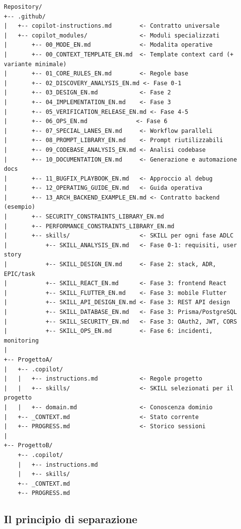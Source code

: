 \begin{lstlisting}[language={},title={Struttura del framework}]
Repository/
+-- .github/
|   +-- copilot-instructions.md        <- Contratto universale
|   +-- copilot_modules/               <- Moduli specializzati
|       +-- 00_MODE_EN.md              <- Modalita operative
|       +-- 00_CONTEXT_TEMPLATE_EN.md  <- Template context card (+ variante minimale)
|       +-- 01_CORE_RULES_EN.md        <- Regole base
|       +-- 02_DISCOVERY_ANALYSIS_EN.md <- Fase 0-1
|       +-- 03_DESIGN_EN.md            <- Fase 2
|       +-- 04_IMPLEMENTATION_EN.md    <- Fase 3
|       +-- 05_VERIFICATION_RELEASE_EN.md <- Fase 4-5
|       +-- 06_OPS_EN.md              <- Fase 6
|       +-- 07_SPECIAL_LANES_EN.md     <- Workflow paralleli
|       +-- 08_PROMPT_LIBRARY_EN.md    <- Prompt riutilizzabili
|       +-- 09_CODEBASE_ANALYSIS_EN.md <- Analisi codebase
|       +-- 10_DOCUMENTATION_EN.md     <- Generazione e automazione docs
|       +-- 11_BUGFIX_PLAYBOOK_EN.md   <- Approccio al debug
|       +-- 12_OPERATING_GUIDE_EN.md   <- Guida operativa
|       +-- 13_ARCH_BACKEND_EXAMPLE_EN.md <- Contratto backend (esempio)
|       +-- SECURITY_CONSTRAINTS_LIBRARY_EN.md
|       +-- PERFORMANCE_CONSTRAINTS_LIBRARY_EN.md
|       +-- skills/                    <- SKILL per ogni fase ADLC
|           +-- SKILL_ANALYSIS_EN.md   <- Fase 0-1: requisiti, user story
|           +-- SKILL_DESIGN_EN.md     <- Fase 2: stack, ADR, EPIC/task
|           +-- SKILL_REACT_EN.md      <- Fase 3: frontend React
|           +-- SKILL_FLUTTER_EN.md    <- Fase 3: mobile Flutter
|           +-- SKILL_API_DESIGN_EN.md <- Fase 3: REST API design
|           +-- SKILL_DATABASE_EN.md   <- Fase 3: Prisma/PostgreSQL
|           +-- SKILL_SECURITY_EN.md   <- Fase 3: OAuth2, JWT, CORS
|           +-- SKILL_OPS_EN.md        <- Fase 6: incidenti, monitoring
|
+-- ProgettoA/
|   +-- .copilot/
|   |   +-- instructions.md            <- Regole progetto
|   |   +-- skills/                    <- SKILL selezionati per il progetto
|   |   +-- domain.md                  <- Conoscenza dominio
|   +-- _CONTEXT.md                    <- Stato corrente
|   +-- PROGRESS.md                    <- Storico sessioni
|
+-- ProgettoB/
    +-- .copilot/
    |   +-- instructions.md
    |   +-- skills/
    +-- _CONTEXT.md
    +-- PROGRESS.md
\end{lstlisting}

\subsection{Il principio di separazione}

